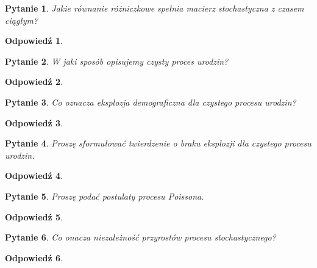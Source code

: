 \documentclass[12pt]{mwart}
\theoremstyle{plain}
\newtheorem{pytanie}{Pytanie}
\theoremstyle{break}
\newtheorem*{odpowiedź}{Odpowiedź}
\begin{document}
\begin{pytanie}
Jakie równanie różniczkowe spełnia macierz stochastyczna z czasem ciągłym?
\end{pytanie}
\begin{odpowiedź}
\end{odpowiedź}


\begin{pytanie}
W jaki sposób opisujemy czysty proces urodzin?
\end{pytanie}
\begin{odpowiedź}
\end{odpowiedź}


\begin{pytanie}
Co oznacza eksplozja demograficzna dla czystego procesu urodzin?
\end{pytanie}
\begin{odpowiedź}
\end{odpowiedź}


\begin{pytanie}
Proszę sformułować twierdzenie o braku eksplozji dla czystego procesu urodzin.
\end{pytanie}
\begin{odpowiedź}
\end{odpowiedź}


\begin{pytanie}
Proszę podać postulaty procesu Poissona.
\end{pytanie}
\begin{odpowiedź}
\end{odpowiedź}


\begin{pytanie}
Co onacza niezależność przyrostów procesu stochastycznego?
\end{pytanie}
\begin{odpowiedź}
\end{odpowiedź}
\end{document}
